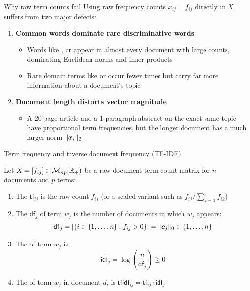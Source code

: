 \documentclass[aspectratio=169]{beamer}\usepackage[]{graphicx}\usepackage[]{xcolor}
\begin{document}

\begin{frame}{Why raw term counts fail}
Using raw frequency counts $x_{ij} = f_{ij}$ directly in $X$ suffers from two major defects:
\vfill
\begin{enumerate}
\item \textbf{Common words dominate rare discriminative words}
\begin{itemize}
\item Words like ,  or  appear in almost every document with large counts, dominating Euclidean norms and inner products
\item Rare domain terms like  or  occur fewer times but carry far more information about a document's topic
\end{itemize}
\vfill
\item \textbf{Document length distorts vector magnitude}
\begin{itemize}
\item A 20-page article and a 1-paragraph abstract on the exact same topic have proportional term frequencies, but the longer document has a much larger norm $\|\bm{x}_i\|_2$
\end{itemize}
\end{enumerate}
\end{frame}


\begin{frame}{Term frequency and inverse document frequency (TF-IDF)}
\begin{importantdefinition}
Let $X = [f_{ij}] \in \mathcal{M}_{np}(\mathbb{R}_+)$ be a raw document-term count matrix for $n$ documents and $p$ terms:
\begin{enumerate}
\item The  $\mathsf{tf}_{ij}$ is the raw count $f_{ij}$ (or a scaled variant such as $f_{ij} / \sum_{k=1}^p f_{ik}$)
\item The  $\mathsf{df}_j$ of term $w_j$ is the number of documents in which $w_j$ appears:
\[
\mathsf{df}_j = \left|\{i \in \{1, \ldots, n\} : f_{ij} > 0\}\right| = \|\bm{c}_j\|_0 \in \{1, \ldots, n\}
\]
\item The  of term $w_j$ is
\[
\mathsf{idf}_j = \log\!\left(\frac{n}{\mathsf{df}_j}\right) \ge 0
\]
\item The  of term $w_j$ in document $d_i$ is $\mathsf{tfidf}_{ij} = \mathsf{tf}_{ij} \cdot \mathsf{idf}_j$
\end{enumerate}
\end{importantdefinition}
\end{frame}
\end{document}
